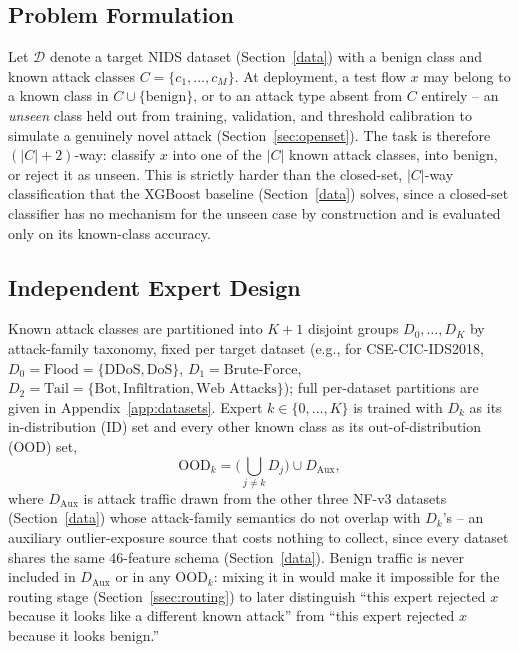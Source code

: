 \documentclass[sigconf]{acmart}
\begin{document}
\subsection{Problem Formulation}
Let $\mathcal{D}$ denote a target NIDS dataset (Section~\ref{data}) with a benign class and known attack classes $C = \{c_1, \ldots, c_M\}$. At deployment, a test flow $x$ may belong to a known class in $C \cup \{\text{benign}\}$, or to an attack type absent from $C$ entirely -- an \textit{unseen} class held out from training, validation, and threshold calibration to simulate a genuinely novel attack (Section~\ref{sec:openset}). The task is therefore $(|C|+2)$-way: classify $x$ into one of the $|C|$ known attack classes, into benign, or reject it as unseen. This is strictly harder than the closed-set, $|C|$-way classification that the XGBoost baseline (Section~\ref{data}) solves, since a closed-set classifier has no mechanism for the unseen case by construction and is evaluated only on its known-class accuracy.

\subsection{Independent Expert Design} \label{ssec:expert-design}
Known attack classes are partitioned into $K{+}1$ disjoint groups $D_0, \ldots, D_K$ by attack-family taxonomy, fixed per target dataset (e.g., for CSE-CIC-IDS2018, $D_0 = \text{Flood} = \{\text{DDoS}, \text{DoS}\}$, $D_1 = \text{Brute-Force}$, $D_2 = \text{Tail} = \{\text{Bot}, \text{Infiltration}, \text{Web Attacks}\}$); full per-dataset partitions are given in Appendix~\ref{app:datasets}. Expert $k \in \{0, \ldots, K\}$ is trained with $D_k$ as its in-distribution (ID) set and every other known class as its out-of-distribution (OOD) set,
\begin{equation}
\text{OOD}_k = \Big(\bigcup_{j \neq k} D_j\Big) \cup D_{\mathrm{Aux}},
\end{equation}
where $D_{\mathrm{Aux}}$ is attack traffic drawn from the other three NF-v3 datasets (Section~\ref{data}) whose attack-family semantics do not overlap with $D_k$'s -- an auxiliary outlier-exposure source that costs nothing to collect, since every dataset shares the same 46-feature schema (Section~\ref{data}). Benign traffic is never included in $D_{\mathrm{Aux}}$ or in any $\text{OOD}_k$: mixing it in would make it impossible for the routing stage (Section~\ref{ssec:routing}) to later distinguish ``this expert rejected $x$ because it looks like a different known attack'' from ``this expert rejected $x$ because it looks benign.''
\end{document}

